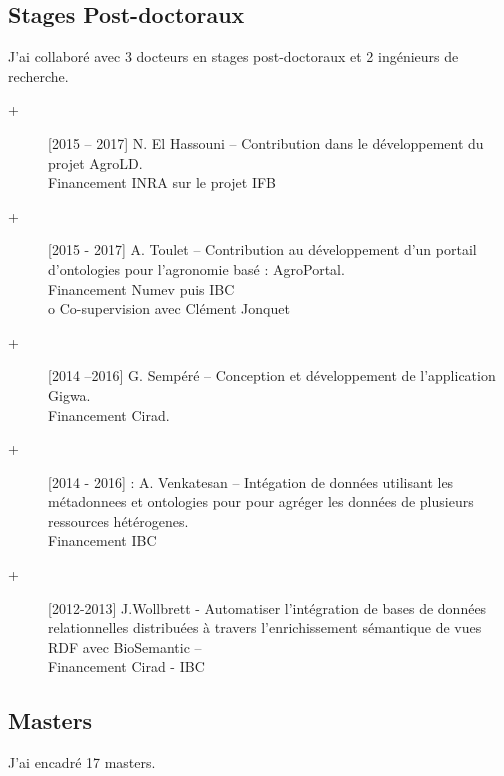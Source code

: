 \subsection*{Stages Post-doctoraux}

J’ai collaboré avec 3 docteurs en stages post-doctoraux et 2 ingénieurs de recherche.
\begin{description}
\item [+] [2015 – 2017] N. El Hassouni – Contribution dans le développement du projet AgroLD.\\
Financement INRA sur le projet IFB 
\item [+] [2015 - 2017] A. Toulet – Contribution au développement d’un portail d’ontologies pour l’agronomie basé : AgroPortal.\\
Financement Numev puis IBC\\
o	Co-supervision avec Clément Jonquet
\item [+] [2014 –2016] G. Sempéré – Conception et développement de l’application Gigwa.\\
Financement Cirad.
\item [+] [2014 - 2016] : A. Venkatesan – Intégation de données utilisant les métadonnees et ontologies pour pour agréger les données de plusieurs ressources hétérogenes.\\
Financement IBC
\item [+] [2012-2013] J.Wollbrett - Automatiser l’intégration de bases de données relationnelles distribuées à travers l’enrichissement sémantique de vues RDF avec BioSemantic –\\
Financement Cirad - IBC
\end{description}

\subsection*{Masters }

J’ai encadré 17 masters.
